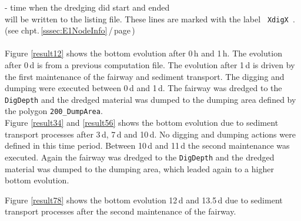 \hspace*{3mm} - time when the dredging did start and ended \\
will be written to the listing file. These lines are marked with the label \texttt{~XdigX~}.\\
(see chpt.\,\ref{sssec:E1NodeInfo}\,/\,page\,\pageref{txt:E1XdigX})
 \label{txt:E3XdigX}\\
\\
Figure \ref{result12} shows the bottom evolution after 0\,h and 1\,h. The evolution after 0\,d is from a previous computation file.
The evolution after 1\,d is driven by the first maintenance of the fairway and sediment transport.
The digging and dumping were executed between 0\,d and 1\,d.
The fairway was dredged to the \texttt{DigDepth} and the dredged material was dumped to the dumping area
defined by the polygon \texttt{200\_DumpArea}.\\
Figure \ref{result34} and \ref{result56} shows the bottom evolution due to sediment transport processes after 3\,d, 7\,d and 10\,d.
No digging and dumping actions were defined in this time period. Between 10\,d and 11\,d the second maintenance was executed.
Again the fairway was dredged to the \texttt{DigDepth} and the dredged material was dumped to the dumping area, which
leaded again to a higher bottom evolution.

Figure \ref{result78} shows the bottom evolution  12\,d and 13.5\,d due to sediment transport processes after the
second maintenance of the fairway.

